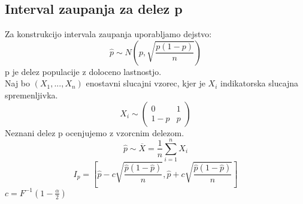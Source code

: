\subsection{Interval zaupanja za delez p}
Za konstrukcijo intervala zaupanja uporabljamo dejstvo:\\
$$\hat{p}\sim N(p, \sqrt{\frac{p(1-p)}{n}})$$
p je delez populacije z doloceno lastnostjo.\\
Naj bo $(X_1,...,X_n)$ enostavni slucajni vzorec, kjer je $X_i$ indikatorska slucajna spremenljivka.
\begin{equation*}
X_i \sim
\begin{pmatrix}
   0 & 1\\
   1-p & p 
\end{pmatrix}
\end{equation*}
Neznani delez p ocenjujemo z vzorcnim delezom.\\
$$ \hat{p} \sim \overline{X}=\frac{1}{n}\sum\limits^n_{i=1} X_i$$
$$I_p = \left[\hat{p}-c \sqrt{\frac{\hat{p}(1-\hat{p})}{n}}, \hat{p} + c \sqrt{\frac{\hat{p}(1-\hat{p})}{n}}\right]$$
$c=F^{-1}(1-\frac{\alpha}{2})$

